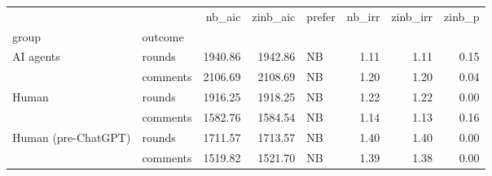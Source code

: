\begin{tabular}{llrrlrrr}
\toprule
 &  & nb_aic & zinb_aic & prefer & nb_irr & zinb_irr & zinb_p \\
group & outcome &  &  &  &  &  &  \\
\midrule
\multirow[t]{2}{*}{AI agents} & rounds & 1940.86 & 1942.86 & NB & 1.11 & 1.11 & 0.15 \\
 & comments & 2106.69 & 2108.69 & NB & 1.20 & 1.20 & 0.04 \\
\cline{1-8}
\multirow[t]{2}{*}{Human} & rounds & 1916.25 & 1918.25 & NB & 1.22 & 1.22 & 0.00 \\
 & comments & 1582.76 & 1584.54 & NB & 1.14 & 1.13 & 0.16 \\
\cline{1-8}
\multirow[t]{2}{*}{Human (pre-ChatGPT)} & rounds & 1711.57 & 1713.57 & NB & 1.40 & 1.40 & 0.00 \\
 & comments & 1519.82 & 1521.70 & NB & 1.39 & 1.38 & 0.00 \\
\cline{1-8}
\bottomrule
\end{tabular}
